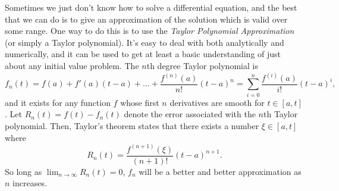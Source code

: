 \documentclass[12pt]{book}
\begin{document}
Sometimes we just don't know how to solve a differential equation, and
the best that we can do is to give an approximation of the solution
which is valid over some range. One way to do this is to use the
\emph{Taylor Polynomial Approximation} (or simply a Taylor
polynomial). It's easy to deal with both analytically and numerically,
and it can be used to get at least a basic understanding of just about
any initial value problem. The $n$th degree Taylor polynomial is
\begin{dmath*}
  \boxed{
    f_n(t) 
    = f(a) + f'(a)(t-a) + \dots + \frac{f^{(n)}(a)}{n!} (t-a)^n
    = \sum_{i=0}^n \frac{f^{(i)}(a)}{i!}(t-a)^i
  },
\end{dmath*}
and it exists for any function $f$ whose first $n$ derivatives are
smooth for $t\in [a,t]$.  Let $R_n(t) = f(t) -f_n(t)$ denote the error
associated with the $n$th Taylor polynomial. Then, Taylor's theorem
states that there exists a number $\xi \in [a,t]$ where
\begin{dmath*}
  \boxed{R_n(t) = \frac{f^{(n+1)}(\xi)}{(n+1)!}(t-a)^{n+1}}.
\end{dmath*}
So long as $\lim_{n\rightarrow \infty} R_n(t) =0$, $f_n$ will be a better and
better approximation as $n$ increases.

\end{document}
